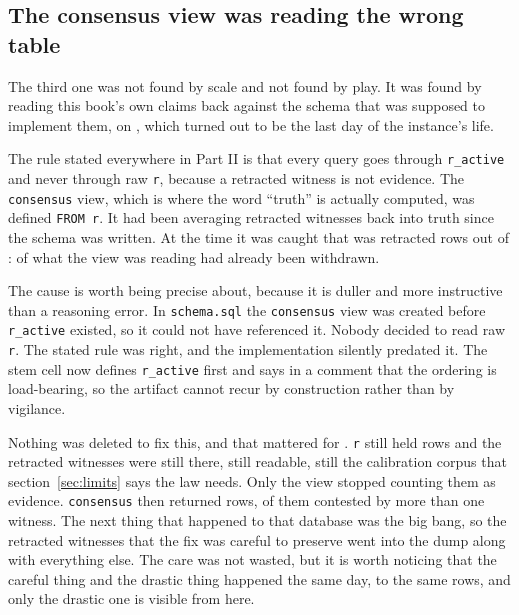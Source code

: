 \subsection{The consensus view was reading the wrong table}
\label{sec:consensus-view-fix}

The third one was not found by scale and not found by play. It was found by reading this book's own claims back against the schema that was supposed to implement them, on \labLineageWipeDate{}, which turned out to be the last day of the instance's life.

The rule stated everywhere in Part II is that every query goes through \texttt{r\_active} and never through raw \texttt{r}, because a retracted witness is not evidence. The \texttt{consensus} view, which is where the word ``truth'' is actually computed, was defined \texttt{FROM r}. It had been averaging retracted witnesses back into truth since the schema was written. At the time it was caught that was \labLineageRetractedRows{} retracted rows out of \labLineageRelations{}: \labLineageRetractedPct{} of what the view was reading had already been withdrawn.

The cause is worth being precise about, because it is duller and more instructive than a reasoning error. In \texttt{schema.sql} the \texttt{consensus} view was created before \texttt{r\_active} existed, so it could not have referenced it. Nobody decided to read raw \texttt{r}. The stated rule was right, and the implementation silently predated it. The stem cell now defines \texttt{r\_active} first and says in a comment that the ordering is load-bearing, so the artifact cannot recur by construction rather than by vigilance.

Nothing was deleted to fix this, and that mattered for \labLineageFixWindow{}. \texttt{r} still held \labLineageRelations{} rows and the retracted witnesses were still there, still readable, still the calibration corpus that section~\ref{sec:limits} says the law needs. Only the view stopped counting them as evidence. \texttt{consensus} then returned \labLineageConsensusRows{} rows, \labLineageContested{} of them contested by more than one witness. The next thing that happened to that database was the big bang, so the retracted witnesses that the fix was careful to preserve went into the dump along with everything else. The care was not wasted, but it is worth noticing that the careful thing and the drastic thing happened the same day, to the same rows, and only the drastic one is visible from here.

